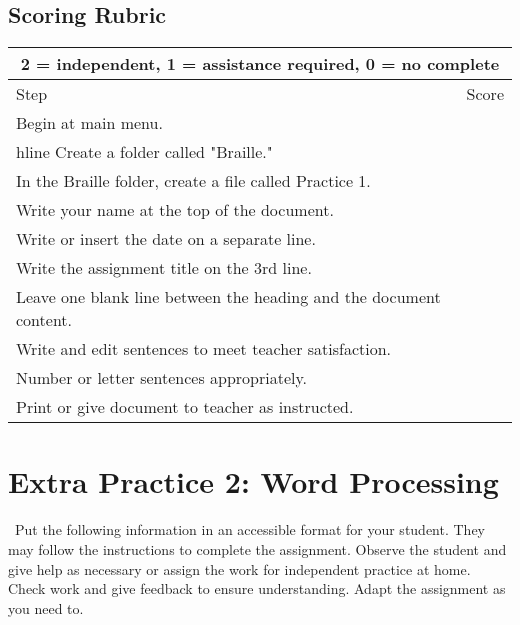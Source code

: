 \documentclass[10pt,letterpaper,twoside]{report}
\begin{document}
\subsection{Scoring Rubric}
{
	\renewcommand{\arraystretch}{1.5}
	\begin{table}[!htbp]
		\centering
		\begin{tabular}{|l|r|}
			\hline
			\multicolumn{2}{|c|}{2 = independent, 1 = assistance required, 0 = no complete} \\
			\hline
			Step                                                               & Score \\[.5em]
			\hline
			Begin at main menu.                                                &       \\hline
			Create a folder called "Braille."                                  &       \\ \hline
			In the Braille folder, create a file called Practice 1.            &       \\ \hline
			Write your name at the top of the document.                        &       \\ \hline
			Write or insert the date on a separate line.                       &       \\ \hline
			Write the assignment title on the 3rd line.                        &       \\ \hline
			Leave one blank line between the heading and the document content. &       \\ \hline
			Write and edit sentences to meet teacher satisfaction.             &       \\ \hline
			Number or letter sentences appropriately.                          &       \\ \hline
			Print or give document to teacher as instructed.                   &       \\ \hline
		\end{tabular}
		
	\end{table}
}
\clearpage
\section{Extra Practice 2: Word Processing}
\
Put the following information in an accessible format for your student. They may follow the instructions to complete the assignment. Observe the student and give help as necessary or assign the work for independent practice at home. Check work and give feedback to ensure understanding. Adapt the assignment as you need to.
\end{document}
